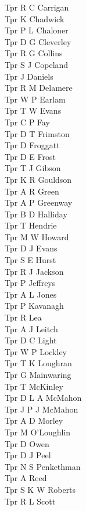 \begin{multicols}{3}
  Tpr R C Carrigan \\
  Tpr K Chadwick \\
  Tpr P L Chaloner \\
  Tpr D G Cleverley \\
  Tpr R G Collins \\
  Tpr S J Copeland \\
  Tpr J Daniels \\
  Tpr R M Delamere \\
  Tpr W P Earlam \\
  Tpr T W Evans \\
  Tpr C P Fay \\
  Tpr D T Frimston \\
  Tpr D Froggatt \\
  Tpr D E Frost \\
  Tpr T J Gibson \\
  Tpr K R Gouldson \\
  Tpr A R Green \\
  Tpr A P Greenway \\
  Tpr B D Halliday \\
  Tpr T Hendrie \\
  Tpr M W Howard \\
  Tpr D J Evans \\
  Tpr S E Hurst \\
  Tpr R J Jackson \\
  Tpr P Jeffreys \\
  Tpr A L Jones \\
  Tpr P Kavanagh \\
  Tpr R Lea \\
  Tpr A J Leitch \\
  Tpr D C Light \\
  Tpr W P Lockley \\
  Tpr T K Loughran \\
  Tpr G Mainwaring \\
  Tpr T McKinley \\
  Tpr D L A McMahon \\
  Tpr J P J McMahon \\
  Tpr A D Morley \\
  Tpr M O'Loughlin \\
  Tpr D Owen \\
  Tpr D J Peel \\
  Tpr N S Penkethman \\
  Tpr A Reed \\
  Tpr S K W Roberts \\
  Tpr R L Scott \\

\end{multicols}

